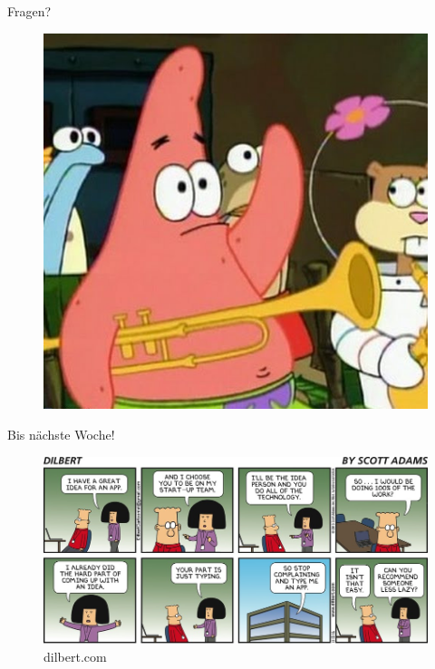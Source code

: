 \documentclass[18pt]{beamer}
\begin{document}
\appendix

\beginbackup

\begin{frame}{Fragen?}
    \begin{figure}
        \includegraphics[scale=.3]{img/fragen.jpg}
    \end{figure}
\end{frame}

\begin{frame}{Bis nächste Woche!}
    \begin{figure}
        \includegraphics[scale=2.8]{img/dt161113.jpg}
        \caption{\footnotesize{dilbert.com}}
    \end{figure}
\end{frame}

\backupend
\end{document}
